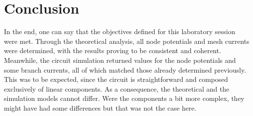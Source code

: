 \section{Conclusion}
\label{sec:conclusion}

\par
In the end, one can say that the objectives defined for this laboratory session were met.
Through the theoretical analysis, all node potentials and mesh currents were determined, with the results proving to be consistent and coherent.
Meanwhile, the circuit simulation returned values for the node potentials and some branch currents, all of which matched those already determined previously. This was to be expected,
since the circuit is straightforward and composed exclusively of linear
components. As a consequence, the theoretical and the simulation models cannot
differ. Were the components a bit more complex, they might have had some
differences but that was not the case here.


